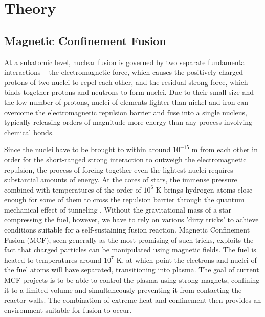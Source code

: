 \chapter{Theory}

\section{Magnetic Confinement Fusion}
At a subatomic level, nuclear fusion is governed by two separate fundamental interactions -- the electromagnetic force, which causes the positively charged protons of two nuclei to repel each other, and the residual strong force, which binds together protons and neutrons to form nuclei. 
Due to their small size and the low number of protons, nuclei of elements lighter than nickel and iron can overcome the electromagnetic repulsion barrier and fuse into a single nucleus, typically releasing orders of magnitude more energy than any process involving chemical bonds.

Since the nuclei have to be brought to within around $10^{-15}$ m from each other in order for the short-ranged strong interaction to outweigh the electromagnetic repulsion, the process of forcing together even the lightest nuclei requires substantial amounts of energy.  
At the cores of stars, the immense pressure combined with temperatures of the order of $10^6$ K brings hydrogen atoms close enough for some of them to cross the repulsion barrier through the quantum mechanical effect of tunneling \cite{clayton1983principles}.
Without the gravitational mass of a star compressing the fuel, however, we have to rely on various 'dirty tricks' to achieve conditions suitable for a self-sustaining fusion reaction. 
Magnetic Confinement Fusion (MCF), seen generally as the most promising of such tricks, exploits the fact that charged particles can be manipulated using magnetic fields. 
The fuel is heated to temperatures around $10^7$ K, at which point the electrons and nuclei of the fuel atoms will have separated, transitioning into plasma. 
The goal of current MCF projects is to be able to control the plasma using strong magnets, confining it to a limited volume and simultaneously preventing it from contacting the reactor walls.
The combination of extreme heat and confinement then provides an environment suitable for fusion to occur.

